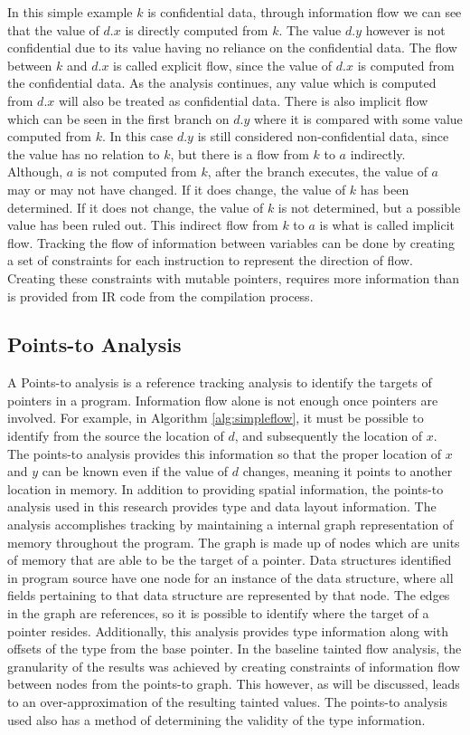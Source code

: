 \documentclass[11pt,a4paper]{article}
\begin{document}
In this simple example $k$ is confidential data, through information flow we
can see that the value of $d.x$ is directly computed from $k$. The value $d.y$
however is not confidential due to its value having no reliance on the
confidential data. The flow between $k$ and $d.x$ is called explicit flow,
since the value of $d.x$ is computed from the confidential data. As the
analysis continues, any value which is computed from $d.x$ will also be
treated as confidential data. There is also implicit flow which can be seen in
the first branch on $d.y$ where it is compared with some value computed from
$k$. In this case $d.y$ is still considered non-confidential data, since the
value has no relation to $k$, but there is a flow from $k$ to $a$ indirectly.
Although, $a$ is not computed from $k$, after the branch executes, the value
of $a$ may or may not have changed. If it does change, the value of $k$ has been
determined. If it does not change, the value of $k$ is not determined, but a
possible value has been ruled out. This indirect flow from $k$ to $a$ is what
is called implicit flow. Tracking the flow of information between variables can
be done by creating a set of constraints for each instruction to represent the
direction of flow. Creating these constraints with mutable pointers, requires
more information than is provided from IR code from the compilation process. 

\subsection{Points-to Analysis}

A Points-to analysis is a reference tracking analysis to identify the targets of
pointers in a program. Information flow alone is not enough once pointers are
involved. For example, in Algorithm \ref{alg:simpleflow}, it must be possible to
identify from the source the location of $d$, and subsequently the location of
$x$. The points-to analysis provides this information so that the proper
location of $x$ and $y$ can be known even if the value of $d$ changes, meaning
it points to another location in memory. In addition to providing spatial
information, the points-to analysis used in this research provides type and data
layout information. The analysis accomplishes tracking by maintaining a internal
graph representation of memory throughout the program. The graph is made up of
nodes which are units of memory that are able to be the target of a pointer.
Data structures identified in program source have one node for an instance of
the data structure, where all fields pertaining to that data structure are
represented by that node. The edges in the graph are references, so it is
possible to identify where the target of a pointer resides. Additionally, this
analysis provides type information along with offsets of the type from the base
pointer. In the baseline tainted flow analysis, the granularity of the results
was achieved by creating  constraints of information flow between nodes from the
points-to graph. This however, as will be discussed, leads to an
over-approximation of the resulting tainted values. The points-to analysis used
also has a method of determining the validity of the type information. 
\end{document}
